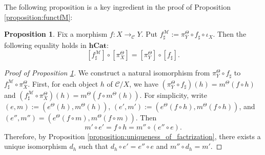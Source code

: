 \documentclass[12pt, a4paper]{amsart}
\theoremstyle{definition}
\newtheorem{proposition}[theorem]{Proposition}
\newcommand{\hCat}{{\mathbf{hCat}}}
\begin{document}
The following proposition is a key ingredient in the proof of Proposition \ref{proposition:functfM}:

\begin{proposition}\label{proposition:fM}
Fix a morphism $f : X \rightarrow_{\mathcal{C}} Y$. Put $f^\mathcal{M}_\sharp := \pi_Y^\Theta \circ f_\sharp \circ \iota_X$. Then the following equality holds in $\hCat$:
\[
[f^\mathcal{M}_\sharp] \circ [\pi^\Theta_X] = [\pi^\Theta_Y] \circ [f_\sharp].
\]
\end{proposition}

\begin{proof}[Proof of Proposition \ref{proposition:fM}]
We construct a natural isomorphism from $\pi^\Theta_Y \circ f_\sharp$ to $f^\mathcal{M}_\sharp \circ \pi^\Theta_X$. First, for each object $h$ of $\mathcal{C}/X$, we have $(\pi^\Theta_Y \circ f_\sharp)(h) = m^\Theta(f \circ h)$ and $(f^\mathcal{M}_\sharp \circ \pi^\Theta_X)(h)= m^\Theta(f \circ m^\Theta(h))$. For simplicity, write $(e,m) := (e^\Theta(h), m^\Theta(h))$, $(e',m') := (e^\Theta(f \circ h), m^\Theta(f \circ h))$, and $(e'',m'') = (e^\Theta(f \circ m),m^\Theta(f \circ m))$. Then
\[
m' \circ e' = f \circ h = m'' \circ (e'' \circ e).
\]
Therefore, by Proposition \ref{proposition:uniqueness_of_factrization}, there exists a unique isomorphism $d_h$ such that $d_h \circ e' = e'' \circ e$ and $m'' \circ d_h = m'$.


\end{proof}
\end{document}

